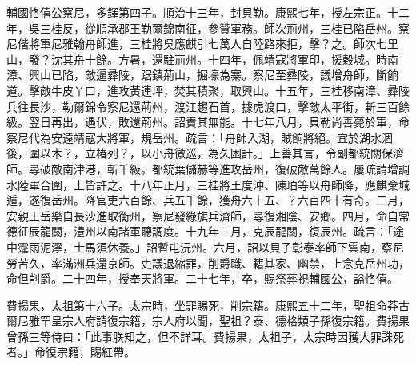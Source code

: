 \begin{pinyinscope}
輔國恪僖公察尼，多鐸第四子。順治十三年，封貝勒。康熙七年，授左宗正。十二年，吳三桂反，從順承郡王勒爾錦南征，參贊軍務。師次荊州，三桂已陷岳州。察尼偕將軍尼雅翰舟師進，三桂將吳應麒引七萬人自陸路來拒，擊？之。師次七里山，發？沈其舟十餘。方暑，還駐荊州。十四年，佩靖寇將軍印，援穀城。時南漳、興山已陷，敵逼彞陵，踞鎮荊山，掘壕為寨。察尼至彞陵，議增舟師，斷餉道。擊敵牛皮丫口，進攻黃連坪，焚其積聚，取興山。十五年，三桂移南漳、彞陵兵往長沙，勒爾錦令察尼還荊州，渡江趨石首，據虎渡口，擊敵太平街，斬三百餘級。翌日再出，遇伏，敗還荊州。詔責其無能。十七年八月，貝勒尚善薨於軍，命察尼代為安遠靖寇大將軍，規岳州。疏言：「舟師入湖，賊餉將絕。宜於湖水涸後，圍以木？，立椿列？，以小舟徼巡，為久困計。」上善其言，令副都統關保濟師。尋破敵南津港，斬千級。都統葉儲赫等進攻岳州，復破敵萬餘人。屢疏請增調水陸軍合圍，上皆許之。十八年正月，三桂將王度沖、陳珀等以舟師降，應麒棄城遁，遂復岳州。降官吏六百餘、兵五千餘，獲舟六十五、？六百四十有奇。二月，安親王岳樂自長沙進取衡州，察尼發綠旗兵濟師，尋復湘陰、安鄉。四月，命自常德征辰龍關，澧州以南諸軍聽調度。十九年三月，克辰龍關，復辰州。疏言：「途中霪雨泥濘，士馬須休養。」詔暫屯沅州。六月，詔以貝子彰泰率師下雲南，察尼勞苦久，率滿洲兵還京師。吏議退縮罪，削爵職、籍其家、幽禁，上念克岳州功，命但削爵。二十四年，授奉天將軍。二十七年，卒，賜祭葬視輔國公，謚恪僖。

費揚果，太祖第十六子。太宗時，坐罪賜死，削宗籍。康熙五十二年，聖祖命莽古爾尼雅罕呈宗人府請復宗籍，宗人府以聞，聖祖？泰、德格類子孫復宗籍。費揚果曾孫三等侍曰：「此事朕知之，但不詳耳。費揚果，太祖子，太宗時因獲大罪誅死者。」命復宗籍，賜紅帶。


\end{pinyinscope}